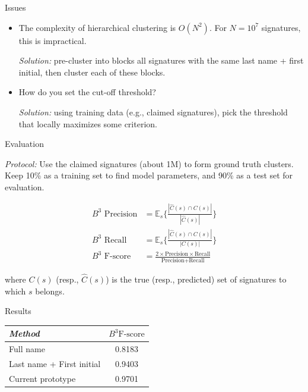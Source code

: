 \documentclass{beamer}
\begin{document}
\begin{frame}{Issues}

\begin{itemize}
\item The complexity of hierarchical clustering is {\color{red} $O(N^2)$}. For $N=10^7$ signatures, this is impractical.

{\it Solution:} pre-cluster into blocks all signatures with the same last name + first initial, then cluster each of these blocks.\\[2em]

\item How do you set the {\color{red} cut-off threshold}?

{\it Solution:} using training data (e.g., claimed signatures), pick the threshold that locally maximizes some criterion.
\end{itemize}

\end{frame}



\begin{frame}{Evaluation}

{\it Protocol:} Use the {\color{blue} claimed signatures} (about 1M) to form {\color{blue} ground truth clusters}. Keep 10\% as a training set to find model parameters, and 90\% as a test set for evaluation.

\begin{align}
\text{$B^3$ Precision} &= \mathbb{E}_s \{ \frac{|\hat{C}(s) \cap C(s)|}{|\hat{C}(s)|}  \} \\
\text{$B^3$ Recall} &= \mathbb{E}_s \{ \frac{|\hat{C}(s) \cap C(s)|}{|C(s)|}  \} \\
\text{$B^3$ F-score} &= \frac{2 \times \text{Precision} \times \text{Recall}}{\text{Precision} + \text{Recall}}
\end{align}

where $C(s)$ (resp., $\hat{C}(s)$) is the true (resp., predicted) set of signatures to which $s$ belongs.


\end{frame}

\begin{frame}{Results}

\begin{table}
    \centering
    \begin{tabular}{| l c |}
    \hline
        \textit{Method} & \textit{$B^3 \text{F-score}$}  \\
    \hline
    \hline
    Full name & 0.8183 \\
    Last name + First initial & 0.9403 \\
    \hline
    Current prototype & {\color{blue} 0.9701} \\
    \hline
    \end{tabular}
\end{table}

\end{frame}
\end{document}
